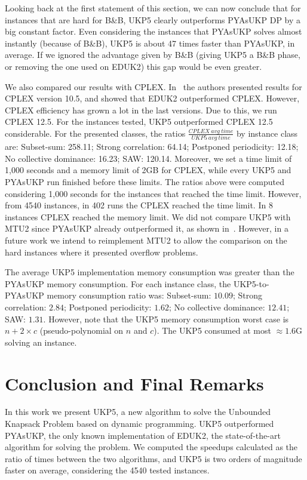 \documentclass[runningheads,a4paper]{llncs}
\begin{document}
Looking back at the first statement of this section, we can now conclude that for instances that are hard for B\&B, UKP5 clearly outperforms PYAsUKP DP by a big constant factor. 
Even considering the instances that PYAsUKP solves almost instantly (because of B\&B), UKP5 is about 47 times faster than PYAsUKP, in average. 
If we ignored the advantage given by B\&B (giving UKP5 a B\&B phase, or removing the one used on EDUK2) this gap would be even greater.

We also compared our results with CPLEX.
In~\cite{pya} the authors presented results for CPLEX version 10.5, and showed that EDUK2 outperformed CPLEX.
However, CPLEX efficiency has grown a lot in the last versions. Due to this, we run CPLEX 12.5.
For the instances tested, UKP5 outperformed CPLEX 12.5 considerable.
For the presented classes, the ratios \(\frac{CPLEX~avg~time}{UKP5~avg~time}\) by instance class are: 
Subset-sum: 258.11; Strong correlation: 64.14; Postponed periodicity: 12.18; No collective dominance: 16.23; SAW: 120.14. 
Moreover, we set a time limit of 1,000 seconds and a memory limit of 2GB for CPLEX, while every UKP5 and PYAsUKP run finished before these limits.
The ratios above were computed considering 1,000 seconds for the instances that reached the time limit.
However, from 4540 instances, in 402 runs the CPLEX reached the time limit.
In 8 instances CPLEX reached the memory limit. 
We did not compare UKP5 with MTU2 since PYAsUKP already outperformed it, as shown in~\cite{pya}.
However, in a future work we intend to reimplement MTU2 to allow the comparison on the hard instances where it presented overflow problems.

The average UKP5 implementation memory consumption was greater than the PYAsUKP memory consumption. For each instance class, the UKP5-to-PYAsUKP memory consumption ratio was: Subset-sum: \(10.09\); Strong correlation: \(2.84\); Postponed periodicity: \(1.62\); No collective dominance: \(12.41\); SAW: \(1.31\). 
However, note that the UKP5 memory consumption worst case is \(n + 2\times c\) (pseudo-polynomial on \(n\) and \(c\)). 
The UKP5 consumed at most \(\approx 1.6\)G solving an instance.

\section{Conclusion and Final Remarks}

In this work we present UKP5, a new algorithm to solve the Unbounded Knapsack Problem based on dynamic programming.
UKP5 outperformed PYAsUKP, the only known implementation of EDUK2, the state-of-the-art algorithm for solving the problem.
We computed the speedups calculated as the ratio of times between the two algorithms, and UKP5 is two orders of magnitude faster on average, considering the 4540 tested instances.
\end{document}
